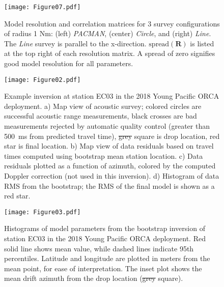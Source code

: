 \documentclass[10pt,titlepage]{article}
\providecommand{\DIFaddtex}[1]{{\protect\color{blue}\uwave{#1}}} %
\providecommand{\DIFdeltex}[1]{{\protect\color{red}\sout{#1}}}                      %
\providecommand{\DIFaddFL}[1]{\DIFadd{#1}} %
\providecommand{\DIFdelFL}[1]{\DIFdel{#1}} %
\providecommand{\DIFaddbeginFL}{} %
\providecommand{\DIFaddendFL}{} %
\providecommand{\DIFdelbeginFL}{} %
\providecommand{\DIFdelendFL}{} %
\providecommand{\DIFadd}[1]{\texorpdfstring{\DIFaddtex{#1}}{#1}} %
\providecommand{\DIFdel}[1]{\texorpdfstring{\DIFdeltex{#1}}{}} %
\begin{document}
\newpage

\begin{figure}
[h]
\texttt{[image: Figure07.pdf]}
\caption{ Model resolution and correlation matrices for 3 survey configurations of radius 1 Nm: (left) \textit{PACMAN}, (center) \textit{Circle}, and (right) \textit{Line}. The \textit{Line} survey is parallel to the x-direction. $\text{spread}(\mathbf{R})$ is listed at the top right of each resolution matrix. A spread of zero signifies good model resolution for all parameters.}
\label{fig:resolution_correlation}
\end{figure}
\newpage

\begin{figure}
[h]
\texttt{[image: Figure02.pdf]}
\caption{Example inversion at station EC03 in the 2018 Young Pacific ORCA deployment. a) Map view of acoustic survey; colored circles are successful acoustic range measurements, black crosses are bad measurements rejected by automatic quality control (greater than 500~ms from predicted travel time), \DIFdelbeginFL \DIFdelFL{grey }\DIFdelendFL \DIFaddbeginFL \DIFaddFL{gray }\DIFaddendFL square is drop location, red star is final location. b) Map view of data residuals based on travel times computed using bootstrap mean station location. c) Data residuals plotted as a function of azimuth, colored by the computed Doppler correction (not used in this inversion). d) Histogram of data RMS from the bootstrap; the RMS of the final model is shown as a red star.}
\label{fig:one_sta_real_survey}
\end{figure}
\newpage

\begin{figure}
[h]
\texttt{[image: Figure03.pdf]}
\caption{Histograms of model parameters from the bootstrap inversion of station EC03 in the 2018 Young Pacific ORCA deployment. Red solid line shows mean value, while dashed lines indicate 95th percentiles. Latitude and longitude are plotted in meters from the mean point, for ease of interpretation. The inset plot shows the mean drift azimuth from the drop location (\DIFdelbeginFL \DIFdelFL{grey }\DIFdelendFL \DIFaddbeginFL \DIFaddFL{gray }\DIFaddendFL square).}
\label{fig:one_sta_real_histograms}
\end{figure}
\newpage
\end{document}
